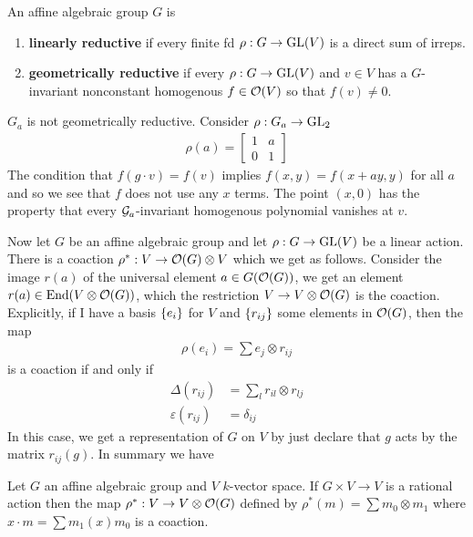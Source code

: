 \documentclass[12pt]{article}
\begin{document}
\begin{definition}
    An affine algebraic group $G$ is \begin{enumerate}
        \item \textbf{linearly reductive} if every finite fd $\rho:G\to\operatorname{GL}(V)$ is a direct sum of irreps.
        \item \textbf{geometrically reductive} if every $\rho:G\to \operatorname{GL}(V)$ and $v\in V$ has a $G$-invariant nonconstant homogenous $f\in \mathcal{O}(V)$ so that $f(v)\neq 0$.
        \end{enumerate}
\end{definition}
\begin{example} $G_a$ is not geometrically reductive. Consider $\rho:G_a\to \operatorname{GL}_2$
    \begin{align*}
        \rho(a) = \begin{bmatrix}
            1 & a\\
            0 & 1
        \end{bmatrix}
    \end{align*} The condition that $f(g\cdot v) = f(v)$ implies $f(x,y) = f(x+ay,y)$ for all $a$ and so we see that $f$ does not use any $x$ terms.
     The point $(x,0)$ has the property that every ${\mathcal{G}}_a$-invariant homogenous polynomial vanishes at $v$. 
\end{example}
Now let $G$ be an affine algebraic group and let $\rho:G\to \operatorname{GL}(V)$ be a linear action. There is a coaction $\rho^*:V\to \mathcal{O}(G)\otimes V$ which we get as follows. Consider the image $r(a)$ of the universal element $a\in G(\mathcal{O}(G))$, we get an element $r(a) \in \operatorname{End}(V\otimes \mathcal{O}(G))$, which the restriction $V\to V\otimes \mathcal{O}(G)$ is the coaction. Explicitly, if I have a basis $\{e_i\}$ for $V$ and $\{r_{ij}\}$ some elements in $\mathcal{O}(G)$, then the map \begin{align*}
    \rho(e_i) = \sum e_j \otimes r_{ij}
\end{align*} is a coaction if and only if \begin{align*}
    \Delta(r_{ij}) &= \sum_{l} r_{il}\otimes r_{lj} \\
    \varepsilon(r_{ij}) &= \delta_{ij}
\end{align*} In this case, we get a representation of $G$ on $V$ by just declare that $g$ acts by the matrix $r_{ij}(g)$. In summary we have \begin{theorem}
    Let $G$ an affine algebraic group and $V$ $k$-vector space. If $G\times V\to V$ is a rational action then the map $\rho^*:V\to V\otimes \mathcal{O}(G)$ defined by $\rho^*(m) = \sum m_0\otimes m_1$ where $x\cdot m = \sum m_1(x)m_0$ is a coaction.
\end{theorem}
\end{document}
